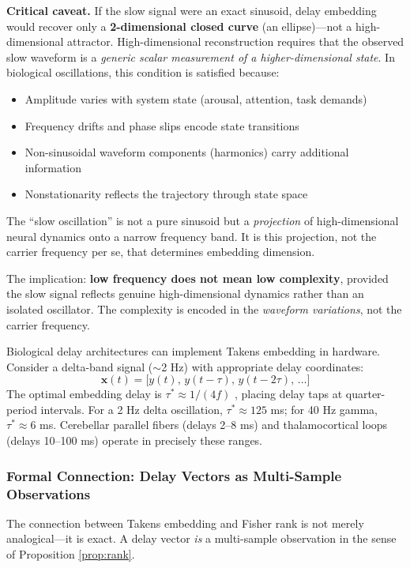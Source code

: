 \documentclass[12pt]{article}
\begin{document}
\textbf{Critical caveat.} If the slow signal were an exact sinusoid, delay embedding would recover only a \textbf{2-dimensional closed curve} (an ellipse)---not a high-dimensional attractor. High-dimensional reconstruction requires that the observed slow waveform is a \emph{generic scalar measurement of a higher-dimensional state}. In biological oscillations, this condition is satisfied because:
\begin{itemize}
    \item Amplitude varies with system state (arousal, attention, task demands)
    \item Frequency drifts and phase slips encode state transitions
    \item Non-sinusoidal waveform components (harmonics) carry additional information
    \item Nonstationarity reflects the trajectory through state space
\end{itemize}
The ``slow oscillation'' is not a pure sinusoid but a \emph{projection} of high-dimensional neural dynamics onto a narrow frequency band. It is this projection, not the carrier frequency per se, that determines embedding dimension.

The implication: \textbf{low frequency does not mean low complexity}, provided the slow signal reflects genuine high-dimensional dynamics rather than an isolated oscillator. The complexity is encoded in the \emph{waveform variations}, not the carrier frequency.

Biological delay architectures can implement Takens embedding in hardware. Consider a delta-band signal ($\sim$2 Hz) with appropriate delay coordinates:
\begin{equation}
    \mathbf{x}(t) = \bigl[ y(t),\, y(t-\tau),\, y(t-2\tau),\, \ldots \bigr]
\end{equation}
The optimal embedding delay is $\tau^* \approx 1/(4f)$ \citep{fraser1986}, placing delay taps at quarter-period intervals. For a 2 Hz delta oscillation, $\tau^* \approx 125$ ms; for 40 Hz gamma, $\tau^* \approx 6$ ms. Cerebellar parallel fibers (delays 2--8 ms) and thalamocortical loops (delays 10--100 ms) operate in precisely these ranges.

\subsubsection{Formal Connection: Delay Vectors as Multi-Sample Observations}

The connection between Takens embedding and Fisher rank is not merely analogical---it is exact. A delay vector \emph{is} a multi-sample observation in the sense of Proposition \ref{prop:rank}.
\end{document}
